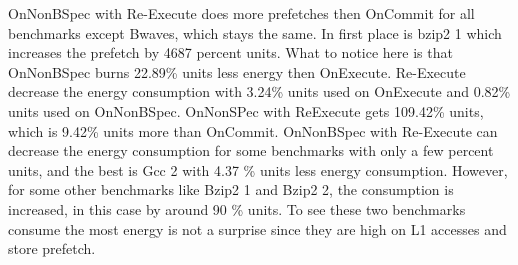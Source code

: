 OnNonBSpec with Re-Execute does more prefetches then OnCommit for all benchmarks except Bwaves, which stays the same. In first place is bzip2 1 which increases the prefetch by 4687 percent units.
\resEnergy 
{}
What to notice here is that OnNonBSpec burns 22.89\% units less energy then
OnExecute. Re-Execute decrease the energy consumption with 3.24\% units used on
OnExecute and 0.82\% units used on OnNonBSpec. OnNonSPec with ReExecute gets
109.42\% units, which is 9.42\% units more than OnCommit.
OnNonBSpec with Re-Execute can decrease the energy consumption for some
benchmarks with only a few percent units, and the best is Gcc 2 with 4.37 \% units
less energy consumption. However, for some other benchmarks like Bzip2 1 and
Bzip2 2, the consumption is increased, in this case by around 90 \% units. To see
these two benchmarks consume the most energy is not a surprise since they are high
on L1 accesses and store prefetch.

